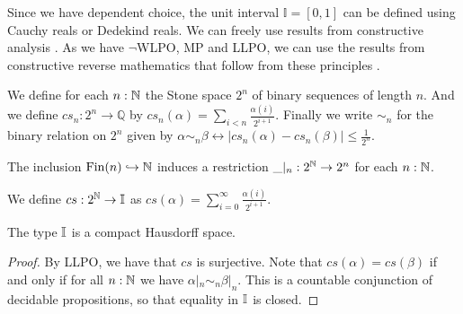Since we have dependent choice, the unit interval $\mathbb I = [0,1]$ can be defined using 
Cauchy reals or Dedekind reals. 
We can freely use results from constructive analysis \cite{Bishop}. 
As we have $\neg$WLPO, MP and LLPO, we can use the results from 
constructive reverse mathematics that follow from these principles \cite{ReverseMathsBishop, HannesDiener}. 
\begin{definition}
  \label{def-cs-Interval}
  We define for each $n:\mathbb{N}$ the Stone space $2^n$ of binary sequences of length $n$.
  And we define $cs_n:2^n \to \mathbb Q$ by 
  $cs_n(\alpha) = \sum_{i < n } \frac{\alpha(i)}{2^{i+1}}.$
  Finally we write $\sim_n$ for the binary relation on $2^n$ given by 
  $\alpha\sim_n \beta 
  \leftrightarrow \left|cs_n(\alpha) - cs_n(\beta)\right|\leq\frac{1}{2^n}$.
\end{definition}
\begin{remark}
  The inclusion $\operatorname{Fin}(n) \hookrightarrow \mathbb{N}$ induces a restriction 
  $\_|_n : 2^{\mathbb{N}} \to 2^n$ for each $n:\mathbb{N}$. 
\end{remark}
\begin{definition}
  We define $cs:2^{\mathbb{N}} \to \mathbb{I}$ as 
  $cs(\alpha) = 
  \sum_{i=0}^\infty \frac{\alpha(i)}{2^{i+1}}.
  $
\end{definition}

\begin{theorem}\label{IntervalIsCHaus}
 The type $\mathbb{I}$ is a compact Hausdorff space.
\end{theorem}
\begin{proof}
  By LLPO, we have that $cs$ is surjective.   
  Note that $cs(\alpha) = cs(\beta)$ if and only if 
  for all $n:\mathbb{N}$ we have $\alpha|_n \sim_n \beta|_n$. 
  This is a countable conjunction of decidable propositions, so that equality in $\mathbb{I}$ is closed.
\end{proof}

